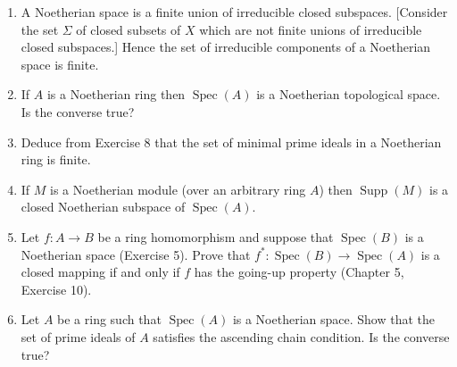 \begin{enumerate}
\item A Noetherian space is a finite union of irreducible closed subspaces. [Consider the set $\Sigma$ of closed subsets of $X$ which are not finite unions of irreducible closed subspaces.] Hence the set of irreducible components of a Noetherian space is finite.

\item If $A$ is a Noetherian ring then $\operatorname{Spec}(A)$ is a Noetherian topological space. Is the converse true?

\item Deduce from Exercise 8 that the set of minimal prime ideals in a Noetherian ring is finite.

\item If $M$ is a Noetherian module (over an arbitrary ring $A$) then $\operatorname{Supp}(M)$ is a closed Noetherian subspace of $\operatorname{Spec}(A)$.

\item Let $f:A\longrightarrow B$ be a ring homomorphism and suppose that $\operatorname{Spec}(B)$ is a Noetherian space (Exercise 5). Prove that $f^*:\operatorname{Spec}(B)\longrightarrow\operatorname{Spec}(A)$ is a closed mapping if and only if $f$ has the going-up property (Chapter 5, Exercise 10).

\item Let $A$ be a ring such that $\operatorname{Spec}(A)$ is a Noetherian space. Show that the set of prime ideals of $A$ satisfies the ascending chain condition. Is the converse true?
\end{enumerate}
